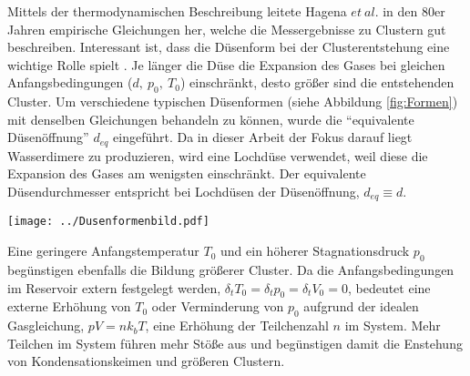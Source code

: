 Mittels der thermodynamischen Beschreibung leitete Hagena $et\ al.$ in den 80er Jahren empirische Gleichungen her, welche die Messergebnisse zu Clustern gut beschreiben. Interessant ist, dass die Düsenform bei der Clusterentstehung eine wichtige Rolle spielt \cite{hagena1972duseform}. Je länger die Düse die Expansion des Gases bei gleichen Anfangsbedingungen ($d,\ p_0, \ T_0$) einschränkt, desto größer sind die entstehenden Cluster. 
Um verschiedene typischen Düsenformen (siehe Abbildung \ref{fig:Formen}) mit denselben Gleichungen behandeln zu können, wurde die \enquote{equivalente Düsenöffnung} $d_{eq}$ eingeführt. Da in dieser Arbeit der Fokus darauf liegt Wasserdimere zu produzieren, wird eine Lochdüse verwendet, weil diese die Expansion des Gases am wenigsten einschränkt. Der equivalente Düsendurchmesser entspricht bei Lochdüsen der Düsenöffnung, $d_{eq} \equiv d$.
\begin{center}
\begin{minipage}{\linewidth}
\centering
\texttt{[image: ../Dusenformenbild.pdf]}%
 \label{fig:Formen}
\end{minipage} 
\end{center}
%
Eine geringere Anfangstemperatur $T_0$ und ein höherer Stagnationsdruck $p_0$  \linebreak begünstigen ebenfalls die Bildung größerer Cluster. Da die Anfangsbedingungen im Reservoir extern festgelegt werden, $\delta_t T_0 = \delta_t p_0 = \delta_t V_0 = 0$, bedeutet eine externe Erhöhung von $T_0$ oder Verminderung von $p_0$ aufgrund der idealen Gasgleichung, $pV = nk_bT$, eine Erhöhung der Teilchenzahl $n$ im System. Mehr Teilchen im System führen mehr Stöße aus und begünstigen damit die Enstehung von Kondensationskeimen und größeren Clustern. \\
